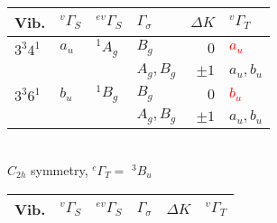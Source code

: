 \documentclass[12pt]{mitthesis}
\begin{document}
\begin{table}
  \centering
  \begin{tabular}{llllrl}
    Vib.
    & $^{v}\Gamma_S$ & $^{ev}\Gamma_S$ & $\Gamma_\sigma$ 
    & $\Delta K$ & $^{v}\Gamma_T$ \\
    \toprule




    $3^3 4^1$ 
    & $a_u$ & $^{1}A_g$ & $B_g$ & $0$ & \textcolor{red}{$a_u$} \\
    & & & $A_g, B_g$ & $\pm1$ & $a_u, b_u$ \\[10pt]

    $3^3 6^1$ 
    & $b_u$ & $^{1}B_g$ & $B_g$ & $0$ & \textcolor{red}{$b_u$} \\
    & & & $A_g, B_g$ & $\pm1$ & $a_u, b_u$ \\

  \end{tabular}\\[5mm]
  
  $C_{2h}$ symmetry, $^{e}\Gamma_T =$ $^{3}B_u$\\[1cm]

  \begin{tabular}{llllrl}
    Vib.
    & $^{v}\Gamma_S$ & $^{ev}\Gamma_S$ & $\Gamma_\sigma$ & $\Delta K$ & $^{v}\Gamma_T$ \\
    \toprule

    

\end{tabular}
\end{table}
\end{document}
